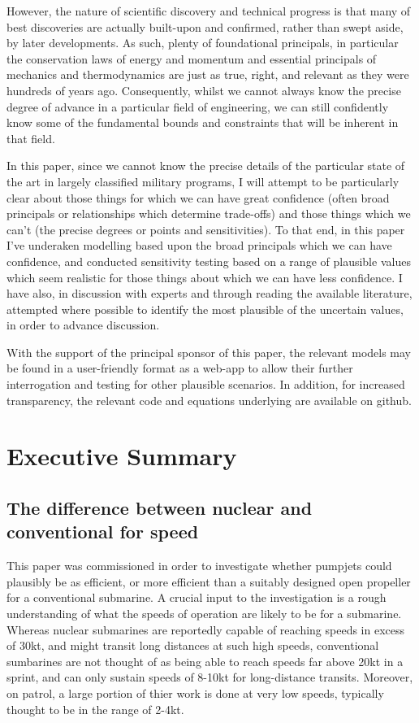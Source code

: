 \documentclass{article}\usepackage[]{graphicx}\usepackage[]{color}
\begin{document}
However, the nature of scientific discovery and technical progress is that many of best discoveries are actually built-upon and confirmed, rather than swept aside, by later developments.  As such, plenty of foundational principals, in particular the conservation laws of energy and momentum and essential principals of mechanics and thermodynamics are just as true, right, and relevant as they were hundreds of years ago.  Consequently, whilst we cannot always know the precise degree of advance in a particular field of engineering, we can still confidently know some of the fundamental bounds and constraints that will be inherent in that field.

In this paper, since we cannot know the precise details of the particular state of the art in largely classified military programs, I will attempt to be particularly clear about those things for which we can have great confidence (often broad principals or relationships which determine trade-offs) and those things which we can't (the precise degrees or points and sensitivities).  To that end, in this paper I've underaken modelling based upon the broad principals which we can have confidence, and conducted sensitivity testing based on a range of plausible values which seem realistic for those things about which we can have less confidence. I have also, in discussion with experts and through reading the available literature, attempted where possible to identify the most plausible of the uncertain values, in order to advance discussion.

With the support of the principal sponsor of this paper, the relevant models may be found in a user-friendly format as a web-app to allow their further interrogation and testing for other plausible scenarios.  In addition, for increased transparency, the relevant code and equations underlying are available on github.

\section{Executive Summary}

\subsection{The difference between nuclear and conventional for speed}

This paper was commissioned in order to investigate whether pumpjets could plausibly be as efficient, or more efficient than a suitably designed open propeller for a conventional submarine. A crucial input to the investigation is a rough understanding of what the speeds of operation are likely to be for a submarine.  Whereas nuclear submarines are reportedly capable of reaching speeds in excess of 30kt, and might transit long distances at such high speeds, conventional sumbarines are not thought of as being able to reach speeds far above 20kt in a sprint, and can only sustain speeds of 8-10kt for long-distance transits.  Moreover, on patrol, a large portion of thier work is done at very low speeds, typically thought to be in the range of 2-4kt.
\end{document}
